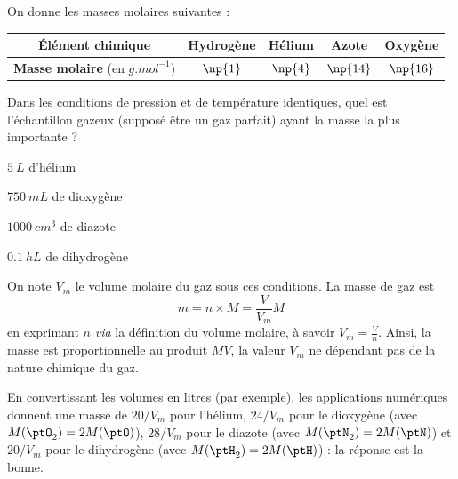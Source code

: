 \debutEntrainement


\begin{enonce}
On donne les masses molaires suivantes : \minusSmallskip

\begin{center}
\renewcommand{\arraystretch}{1.4}
\begin{tabular}{ |c|c|c|c|c| } 
 \hline
 \textbf{Élément chimique} & Hydrogène & Hélium & Azote & Oxygène \\
 \hline 
 \textbf{Masse molaire} (en $\si{g.mol^{-1}}$) & $\np{1}$ & $\np{4}$ & $\np{14}$ & $\np{16}$\\
 \hline
\end{tabular}
\renewcommand{\arraystretch}{1}
\minusSmallskip
\end{center}

Dans les conditions de pression et de température identiques, quel est l'échantillon gazeux (supposé être un gaz parfait) ayant la masse la plus importante ?
	
	\begin{listeQCM2Colonnes}
	\item $\SI{5}{L}$ d'hélium
	\item $\SI{750}{mL}$ de dioxygène
	\item $\SI{1000}{cm^3}$ de diazote
	\item $\SI{0,1}{hL}$ de dihydrogène
	\end{listeQCM2Colonnes}

\end{enonce}

\reponse{\reponseC{}}

\begin{corrige}
	On note $V_m$ le volume molaire du gaz sous ces conditions. La masse de gaz est 
	\[
	m= n \times M=\frac{V}{V_m}M
	\]
	 en exprimant $n$ \emph{via} la définition du volume molaire, à savoir $V_m=\frac{V}{n}$. Ainsi, la masse est proportionnelle au produit $MV$, la valeur $V_m$ ne dépendant pas de la nature chimique du gaz. 
	 
	 En convertissant les volumes en litres (par exemple), les applications numériques donnent une masse de $20/V_m$ pour l'hélium, $24/V_m$ pour le dioxygène (avec $M(\ptO_2)=2M(\ptO)$), $28/V_m$ pour le diazote (avec $M(\ptN_2)=2M(\ptN)$) et $20/V_m$ pour le dihydrogène (avec $M(\ptH_2)=2M(\ptH)$) : la réponse \reponseC{} est la bonne.
\end{corrige}

